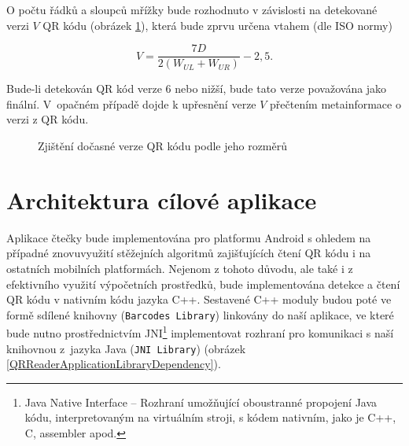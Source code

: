O počtu řádků a sloupců mřížky bude rozhodnuto v závislosti na detekované verzi
$V$ QR kódu (obrázek \ref{DeterminingTheVersionOfQRCode}), která bude zprvu určena
vtahem (dle ISO normy)

\begin{equation}
  V = \frac{7 D}{2 (W_{UL} + W_{UR})} - 2,5\mbox{.}
\end{equation}

\noindent Bude-li detekován QR kód verze 6 nebo nižší, bude tato verze považována jako
finální. V~opačném případě dojde k upřesnění verze $V$ přečtením metainformace 
o verzi z QR kódu. 

\begin{figure}[H]
  \begin{center}
    \caption{Zjištění dočasné verze QR kódu podle jeho rozměrů}
    \label{DeterminingTheVersionOfQRCode}
  \end{center}
\end{figure}

\bigskip
\clearpage
\section{Architektura cílové aplikace}
\label{architekturaCiloveAplikace}

Aplikace čtečky bude implementována pro platformu Android s ohledem na případné
znovuvyužití stěžejních algoritmů zajišťujících čtení QR kódu i na ostatních
mobilních platformách. Nejenom z tohoto důvodu, ale také i z efektivního využití
výpočetních prostředků, bude implementována detekce a čtení QR kódu v nativním
kódu jazyka C++. Sestavené C++ moduly budou poté ve formě sdílené knihovny
(\texttt{Barcodes Library}) linkovány do naší aplikace, ve které bude nutno
prostřednictvím JNI\footnote{Java Native Interface -- Rozhraní umožňující
oboustranné propojení Java kódu, interpretovaným na virtuálním stroji, s kódem
nativním, jako je C++, C, assembler apod. } implementovat rozhraní pro komunikaci s
naší knihovnou z~jazyka Java (\texttt{JNI Library}) (obrázek \ref{QRReaderApplicationLibraryDependency}).

